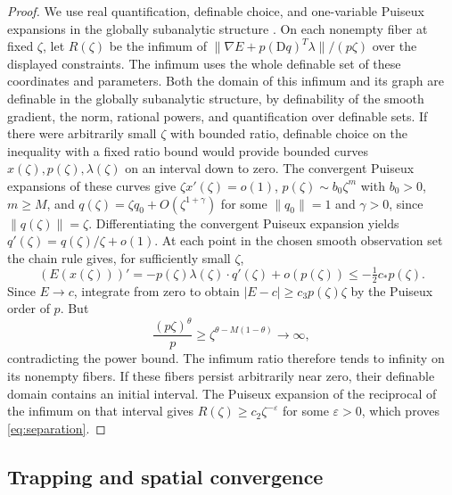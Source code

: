 \begin{proof}
We use real quantification, definable choice, and one-variable Puiseux expansions in the globally subanalytic structure \cite[Theorem~2.1.4 and Propositions~2.2.1 and 1.8.4]{Valette}. On each nonempty fiber at fixed \(\zeta\), let \(R(\zeta)\) be the infimum of \(\|\nabla E+p(\mathrm Dq)^T\lambda\|/(p\zeta)\) over the displayed constraints. The infimum uses the whole definable set of these coordinates and parameters. Both the domain of this infimum and its graph are definable in the globally subanalytic structure, by definability of the smooth gradient, the norm, rational powers, and quantification over definable sets. If there were arbitrarily small \(\zeta\) with bounded ratio, definable choice on the inequality with a fixed ratio bound would provide bounded curves \(x(\zeta),p(\zeta),\lambda(\zeta)\) on an interval down to zero. The convergent Puiseux expansions of these curves give \(\zeta x'(\zeta)=o(1)\), \(p(\zeta)\sim b_0\zeta^m\) with \(b_0>0\), \(m\ge M\), and \(q(\zeta)=\zeta q_0+O(\zeta^{1+\gamma})\) for some \(\|q_0\|=1\) and \(\gamma>0\), since \(\|q(\zeta)\|=\zeta\). Differentiating the convergent Puiseux expansion yields \(q'(\zeta)=q(\zeta)/\zeta+o(1)\). At each point in the chosen smooth observation set the chain rule gives, for sufficiently small \(\zeta\),
\[
 (E(x(\zeta)))'=-p(\zeta)\lambda(\zeta)\cdot q'(\zeta)+o(p(\zeta))
 \le -\tfrac12 c_*p(\zeta).
\]
Since \(E\to c\), integrate from zero to obtain \(|E-c|\ge c_3 p(\zeta)\zeta\) by the Puiseux order of \(p\). But
\[
 \frac{(p\zeta)^\theta}{p}
 \ge \zeta^{\theta-M(1-\theta)}\longrightarrow\infty,
\]
contradicting the power bound. The infimum ratio therefore tends to infinity on its nonempty fibers. If these fibers persist arbitrarily near zero, their definable domain contains an initial interval. The Puiseux expansion of the reciprocal of the infimum on that interval gives \(R(\zeta)\ge c_2\zeta^{-\varepsilon}\) for some \(\varepsilon>0\), which proves \eqref{eq:separation}.
\end{proof}

\subsection{Trapping and spatial convergence}\label{sec:trapping}


